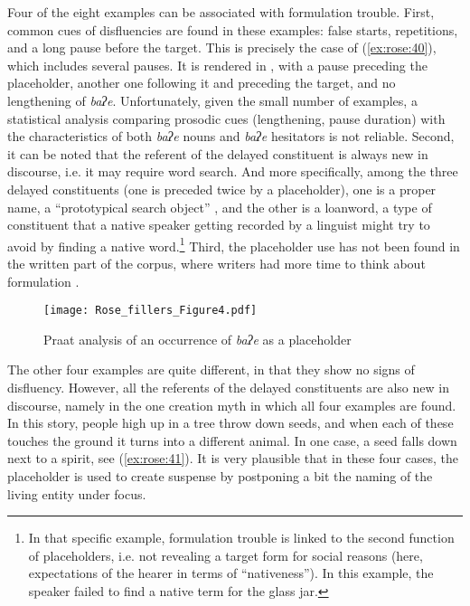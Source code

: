 \documentclass[output=paper]{langscibook}
\begin{document}
Four of the eight examples can be associated with formulation trouble. First, common cues of disfluencies are found in these examples: false starts, repetitions, and a long pause before the target. This is precisely the case of (\ref{ex:rose:40}), which includes several pauses. It is rendered in , with a pause preceding the placeholder, another one following it and preceding the target, and no lengthening of \textit{baʔe}. Unfortunately, given the small number of examples, a statistical analysis comparing prosodic cues (lengthening, pause duration) with the characteristics of both \textit{baʔe} nouns and \textit{baʔe} hesitators is not reliable. Second, it can be noted that the referent of the delayed constituent is always new in discourse, i.e. it may require word search. And more specifically, among the three delayed constituents (one is preceded twice by a placeholder), one is a proper name, a “prototypical search object” \citep[274]{Schegloff1979}, and the other is a loanword, a type of constituent that a native speaker getting recorded by a linguist might try to avoid by finding a native word.\footnote{In that specific example, formulation trouble is linked to the second function of placeholders, i.e. not revealing a target form for social reasons (here, expectations of the hearer in terms of “nativeness”). In this example, the speaker failed to find a native term for the glass jar.} Third, the placeholder use has not been found in the written part of the corpus, where writers had more time to think about formulation \citep[122]{Seraku2022}. 

\begin{figure}
\texttt{[image: Rose\_fillers\_Figure4.pdf]}
\caption{\label{fig:rose:4} Praat analysis of an occurrence of \textit{baʔe} as a placeholder}
\end{figure}

The other four examples are quite different, in that they show no signs of disfluency. However, all the referents of the delayed constituents are also new in discourse, namely in the one creation myth in which all four examples are found. In this story, people high up in a tree throw down seeds, and when each of these touches the ground it turns into a different animal. In one case, a seed falls down next to a spirit, see (\ref{ex:rose:41}). It is very plausible that in these four cases, the placeholder is used to create suspense \citep{Luelsdorff1995} by postponing a bit the naming of the living entity under focus.
\end{document}
